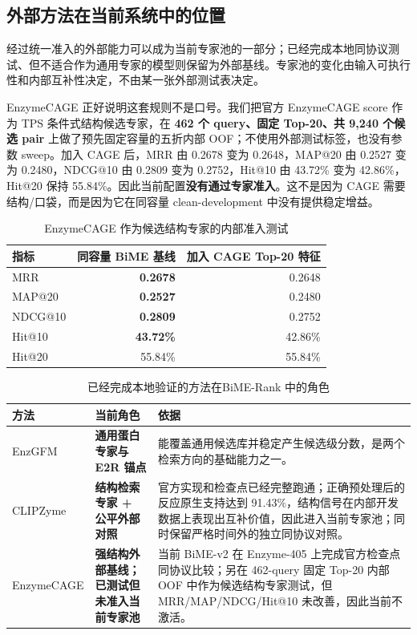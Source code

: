 \documentclass[11pt,a4paper]{ctexart}
\begin{document}
\subsection{外部方法在当前系统中的位置}

经过统一准入的外部能力可以成为当前专家池的一部分；已经完成本地同协议测试、但不适合作为通用专家的模型则保留为外部基线。专家池的变化由输入可执行性和内部互补性决定，不由某一张外部测试表决定。

EnzymeCAGE 正好说明这套规则不是口号。我们把官方 EnzymeCAGE score 作为 TPS 条件式结构候选专家，在 \textbf{462 个 query、固定 Top-20、共 9,240 个候选 pair} 上做了预先固定容量的五折内部 OOF；不使用外部测试标签，也没有参数 sweep。加入 CAGE 后，MRR 由 0.2678 变为 0.2648，MAP@20 由 0.2527 变为 0.2480，NDCG@10 由 0.2809 变为 0.2752，Hit@10 由 43.72\% 变为 42.86\%，Hit@20 保持 55.84\%。因此当前配置\textbf{没有通过专家准入}。这不是因为 CAGE 需要结构/口袋，而是因为它在同容量 clean-development 中没有提供稳定增益。

\begin{table}[htbp]
\centering
\caption{EnzymeCAGE 作为候选结构专家的内部准入测试}
\begin{tabular}{lrr}
\toprule
\textbf{指标} & \textbf{同容量 BiME 基线} & \textbf{加入 CAGE Top-20 特征}\\
\midrule
MRR & \textbf{0.2678} & 0.2648\\
MAP@20 & \textbf{0.2527} & 0.2480\\
NDCG@10 & \textbf{0.2809} & 0.2752\\
Hit@10 & \textbf{43.72\%} & 42.86\%\\
Hit@20 & 55.84\% & 55.84\%\\
\bottomrule
\end{tabular}
\end{table}

\begin{table}[htbp]
\centering
\caption{已经完成本地验证的方法在BiME-Rank 中的角色}
\begin{tabularx}{\textwidth}{@{}L{28mm}L{34mm}Y@{}}
\toprule
\textbf{方法} & \textbf{当前角色} & \textbf{依据}\\
\midrule
EnzGFM & \textbf{通用蛋白专家与 E2R 锚点} & 能覆盖通用候选库并稳定产生候选级分数，是两个检索方向的基础能力之一。\\
CLIPZyme & \textbf{结构检索专家 + 公平外部对照} & 官方实现和检查点已经完整跑通；正确预处理后的反应原生支持达到 91.43\%，结构信号在内部开发数据上表现出互补价值，因此进入当前专家池；同时保留严格时间外的独立同协议对照。\\
EnzymeCAGE & \textbf{强结构外部基线；已测试但未准入当前专家池} & 当前 BiME-v2 在 Enzyme-405 上完成官方检查点同协议比较；另在 462-query 固定 Top-20 内部 OOF 中作为候选结构专家测试，但 MRR/MAP/NDCG/Hit@10 未改善，因此当前不激活。\\
\bottomrule
\end{tabularx}
\end{table}
\end{document}
